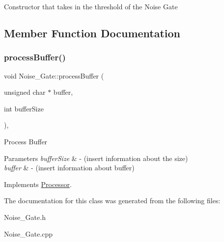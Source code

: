Constructor that takes in the threshold of the Noise Gate 

\subsection{Member Function Documentation}
\mbox{\label{classNoise__Gate_a1b30bc5ccc45774528a8f44ba0632291}} 
\subsubsection{\texorpdfstring{process\+Buffer()}{processBuffer()}}
{\footnotesize\ttfamily void Noise\+\_\+\+Gate\+::process\+Buffer (\begin{DoxyParamCaption}\item[{unsigned char $\ast$}]{buffer,  }\item[{int}]{buffer\+Size }\end{DoxyParamCaption})\hspace{0.3cm}{\ttfamily [override]}, {\ttfamily [virtual]}}

Process Buffer 
\begin{DoxyParams}{Parameters}
{\em buffer\+Size} & -\/ (insert information about the size) \\
\hline
{\em buffer} & -\/ (insert information about buffer) \\
\hline
\end{DoxyParams}


Implements \hyperlink{classProcessor_a401e57b59e43de9c4a51ca0f566d2948}{Processor}.



The documentation for this class was generated from the following files\+:\begin{DoxyCompactItemize}
\item 
Noise\+\_\+\+Gate.\+h\item 
Noise\+\_\+\+Gate.\+cpp\end{DoxyCompactItemize}
